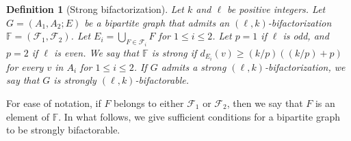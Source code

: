 \documentclass[12pt,reqno,a4paper]{amsart}
\newtheorem{definition}[theorem]{Definition}
\begin{document}
\begin{definition}[Strong bifactorization]
Let \(k\) and \(\ell\) be positive integers.
Let \(G = (A_1,A_2;E)\) be a bipartite graph that admits an
\((\ell,k)\)-bifactorization \(\mathbb{F} = (\mathcal{F}_1,\mathcal{F}_2)\).
Let \(E_i = \bigcup_{F\in\mathcal{F}_i} F\) for $1\leq i\leq 2$. 
Let $p=1$ if $\ell$ is odd, and $p=2$ if $\ell$ is even. 
We say that \(\mathbb{F}\) is \emph{strong}
if \(d_{E_i}(v)\geq (k/p)((k/p)+p)\) for every 
\(v\) in \(A_i\)
for $1\leq i\leq 2$.
If \(G\) admits a strong \((\ell,k)\)-bifactorization, we say that \(G\) is 
\emph{strongly \((\ell,k)\)-bifactorable}.
\end{definition}


For ease of notation, if \(F\) belongs to either \(\mathcal{F}_1\) or 
\(\mathcal{F}_2\), then
we say that \(F\) is an element of \(\mathbb{F}\).
In what follows, we give sufficient conditions for a bipartite graph to be 
strongly
bifactorable.
\end{document}
